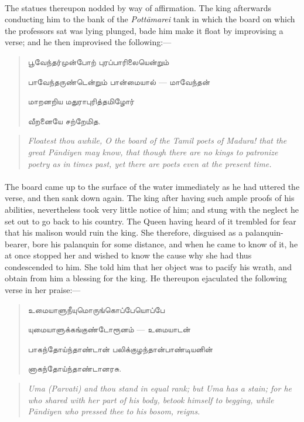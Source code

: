 \documentclass{article}
\newcommand{\TamilText}[1]{\texttamil{#1}}
\newcommand{\tam}[1]{\TamilText{#1}}
\begin{document}
\paragraph{}
The statues thereupon nodded by way of affirmation. The king afterwards conducting him to the bank of the \emph{Pott\={a}marei} tank in which the board on which the professors sat was lying plunged, bade him make it float by improvising a verse; and he then improvised the following:---
\begin{quotation}\small
\tam{பூவேந்தர்முன்போற்‌ புரப்பாரிலையென்றும்‌}

\tam{பாவேந்தருண்டென்றும்‌ பான்மையால்‌} --- \tam{மாவேந்தன்‌}

\tam{மாறனறிய மதுராபுரித்தமிழோர்‌}

\tam{வீறனையே சற்றேமித}.
\end{quotation}
\begin{quotation}\small
\emph{Floatest thou awhile, O the board of the Tamil poets of Madura! that the great P\={a}ndiyen may know, that though there are no kings to patronize poetry as in times past, yet there are poets even at the present time.}
\end{quotation}
\paragraph{}
The board came up to the surface of the water immediately as he had uttered the verse, and then sank down again. The king after having such ample proofs of his abilities, nevertheless took very little notice of him; and stung with the neglect he set out to go back to his country. The Queen having heard of it trembled for fear that his malison would ruin the king. She therefore, disguised as a palanquin-bearer, bore his palanquin for some distance, and when he came to know of it, he at once stopped her and wished to know the cause why she had thus condescended to him. She told him that her object was to pacify his wrath, and obtain from him a blessing for the king. He thereupon ejaculated the following verse in her praise:---
\begin{quotation}\small
\tam{உமையாளுநீயுமொருங்கொப்பேயொப்‌பே}

\tam{யுமையாளுக்கங்குண்டோரூனம்‌} --- \tam{உமையாடன்‌}

\tam{பாகந்தோய்ந்தாண்டான்‌ பலிக்குழந்தான்பாண்டியனின்‌}

\tam{னாகந்தோய்ந்தாண்டானரசு}.
\end{quotation}
\begin{quotation}\small
\emph{Uma (Parvati) and thou stand in equal rank; but Uma has a stain; for he who shared with her part of his body, betook himself to begging, while P\={a}ndiyen who pressed thee to his bosom, reigns.}
\end{quotation}
\end{document}
